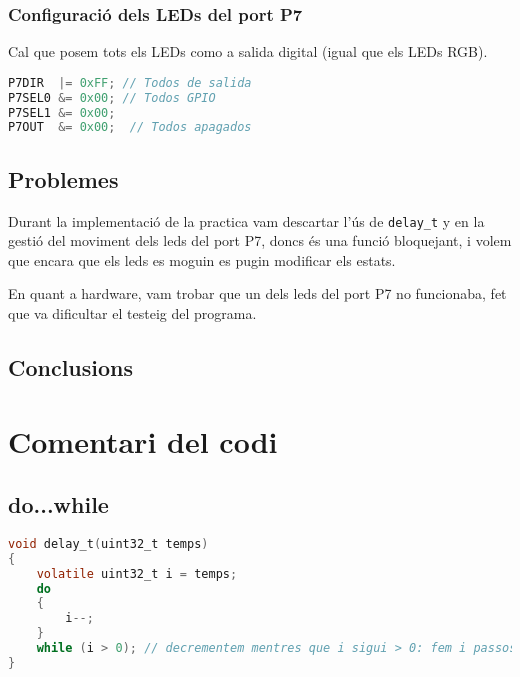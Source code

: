 \documentclass[12pt,a4paper]{article}
\begin{document}
\subsubsection{Configuració dels LEDs del port P7}

Cal que posem tots els LEDs como a salida digital (igual que els LEDs RGB).

\begin{lstlisting}[language=C]
P7DIR  |= 0xFF; // Todos de salida
P7SEL0 &= 0x00; // Todos GPIO
P7SEL1 &= 0x00;
P7OUT  &= 0x00;  // Todos apagados
\end{lstlisting}



\subsection{Problemes}
Durant la implementació de la practica vam descartar l'ús de \texttt{delay\_t} y en la gestió del moviment dels leds del port P7, doncs és una funció bloquejant, i volem que encara que els leds es moguin es pugin modificar els estats.

En quant a hardware, vam trobar que un dels leds del port P7 no funcionaba, fet que va dificultar el testeig del programa.

\subsection{Conclusions}

\section{Comentari del codi}

\subsection{do...while}

\begin{lstlisting}[language=C]
void delay_t(uint32_t temps)
{
    volatile uint32_t i = temps;
    do
    {
        i--;
    }
    while (i > 0); // decrementem mentres que i sigui > 0: fem i passos
}
\end{lstlisting}
\end{document}
